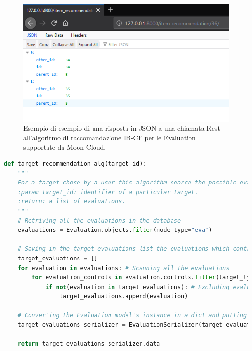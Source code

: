 \begin{figure}[ht!]
	\centering
	\includegraphics[scale=0.5]{images/IB_CF_Evaluation_test.png}
	\caption{Esempio di esempio di una risposta in JSON a una chiamata Rest all'algoritmo di raccomandazione IB-CF per le Evaluation
	supportate da Moon Cloud.}
	\label{fig:IB_CF_Eval_resp_json}
\end{figure}


\lstset{style=python_code_style}
\label{lst:IB_CF_Target}
\begin{lstlisting}[language=Python, caption={Implementazione del IB-CF per i Target supportati da Moon Cloud.}]
def target_recommendation_alg(target_id):
	"""
	For a target chose by a user this algorithm search the possible evaluations that can be recommended for that user.
	:param target_id: identifier of a particular target.
	:return: a list of evaluations.
	"""
	# Retriving all the evaluations in the database
	evaluations = Evaluation.objects.filter(node_type="eva")

	# Saving in the target_evaluations list the evaluations which controls have target_type_id equal to target_id
	target_evaluations = []
	for evaluation in evaluations: # Scanning all the evaluations
		for evaluation_controls in evaluation.controls.filter(target_type_id=target_id):
			if not(evaluation in target_evaluations): # Excluding evaluations duplicated
				target_evaluations.append(evaluation)

	# Converting the Evaluation model's instance in a dict and putting the evaluation, as a dict, in a list
	target_evaluations_serializer = EvaluationSerializer(target_evaluations, many=True)

	return target_evaluations_serializer.data
\end{lstlisting}

